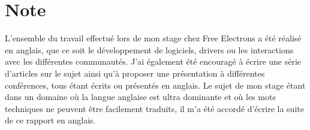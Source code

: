 \chapter*{Note}

L'ensemble du travail effectué lors de mon stage chez Free Electrons a été réalisé en anglais, que ce soit le développement de logiciels, drivers ou les interactions avec les différentes communautés. J'ai également été encouragé à écrire une série d'articles sur le sujet ainsi qu'à proposer une présentation à différentes conférences, tous étant écrits ou présentés en anglais. Le sujet de mon stage étant dans un domaine où la langue anglaise est ultra dominante et où les mots techniques ne peuvent être facilement traduits, il m'a été accordé d'écrire la suite de ce rapport en anglais.
